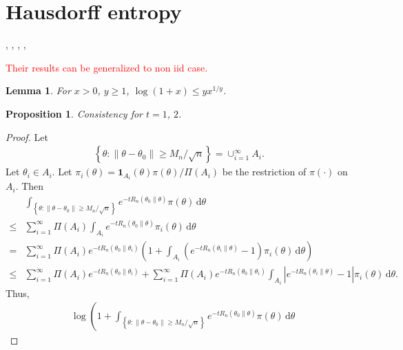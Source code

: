 \documentclass[11pt]{article}
\newcommand\CG[1]{\textcolor{red}{#1}}
\theoremstyle{plain}
\newtheorem{proposition}{\quad\quad Proposition}
\newtheorem{lemma}{\quad\quad Lemma}
\theoremstyle{definition}
\theoremstyle{remark}
\begin{document}
\section{Hausdorff entropy}
\cite{Xing2008},
\cite{Xing2009},
\cite{Xing2010},
\cite{Xing2015},


\CG{Their results can be generalized to non iid case.}


\begin{lemma}
    For $x>0$, $y\geq 1$, $\log (1+ x) \leq  y x^{1/y}$.
\end{lemma}

\begin{proposition}
    Consistency for $t =1 $, $2$.
    \label{newConsistency}
\end{proposition}
\begin{proof}
    Let 
    \begin{align*}
    \left\{ \theta: \|\theta - \theta_0\| \geq M_n /\sqrt n \right\}
    = \cup_{i=1}^\infty A_i.
    \end{align*}
    Let $\theta_i \in A_i$.
    Let $\pi_i (\theta)= \mathbf 1_{A_i}(\theta) \pi(\theta)/\Pi(A_i)$ be the restriction of $\pi(\cdot )$ on $A_i$.
    Then
    \begin{align*}
        &
        \int_{
    \left\{ \theta: \|\theta - \theta_0\| \geq M_n /\sqrt n \right\}
        }
        e^{-t R_n (\theta_0 \| \theta)} \pi(\theta) \, \mathrm d \theta
        \\
        \leq
        &
        \sum_{i=1}^\infty
        \Pi(A_i)
        \int_{
            A_i
        }
        e^{-t R_n (\theta_0 \| \theta)} \pi_i(\theta) \, \mathrm d \theta
        \\
        =
        &
        \sum_{i=1}^\infty
        \Pi(A_i)
e^{-t R_n (\theta_0 \| \theta_i)}
\left( 
    1
+
        \int_{
            A_i
        }
        (e^{-t R_n (\theta_i\| \theta)} -1) \pi_i(\theta) \, \mathrm d \theta
\right)
        \\
        \leq
        &
        \sum_{i=1}^\infty
        \Pi(A_i)
e^{-t R_n (\theta_0 \| \theta_i)}
+
        \sum_{i=1}^\infty
        \Pi(A_i)
e^{-t R_n (\theta_0 \| \theta_i)}
        \int_{
            A_i
        }
        |e^{-t R_n (\theta_i\| \theta)} -1| \pi_i(\theta) \, \mathrm d \theta
        .
    \end{align*}
    Thus,
    \begin{align*}
        &
    \log
    \left(
        1+ 
        \int_{
    \left\{ \theta: \|\theta - \theta_0\| \geq M_n /\sqrt n \right\}
        }
        e^{-t R_n (\theta_0 \| \theta)} \pi(\theta) \, \mathrm d \theta

\end{align*}
\end{proof}
\end{document}
